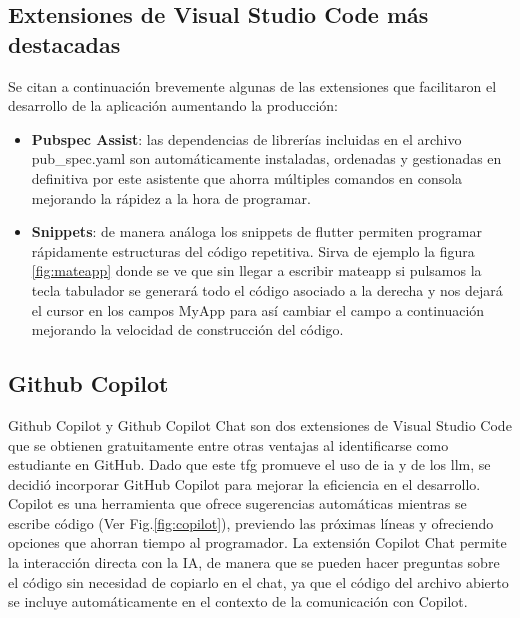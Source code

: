 	\subsection{Extensiones de Visual Studio Code más destacadas}
		Se citan a continuación brevemente algunas de las extensiones que facilitaron el desarrollo de la aplicación aumentando la producción:
		\begin{itemize}
		
		\item \textbf{Pubspec Assist}: las dependencias de librerías incluidas en el archivo pub\_spec.yaml son automáticamente instaladas, ordenadas y gestionadas en definitiva por este asistente que ahorra múltiples comandos en consola mejorando la rápidez a la hora de programar.
		
		\item \textbf{Snippets}: de manera análoga los snippets de flutter permiten programar rápidamente estructuras del código repetitiva. 
		Sirva de ejemplo la figura \ref{fig:mateapp} donde se ve que sin llegar a escribir mateapp si pulsamos la tecla tabulador se generará todo el código asociado a la derecha y nos dejará el cursor en los campos MyApp para así cambiar el campo a continuación mejorando la velocidad de construcción del código.		
		\end{itemize}

	\subsection{Github Copilot}
	Github Copilot y Github Copilot Chat\cite{vscode_copilot} son dos extensiones de Visual Studio Code que se obtienen gratuitamente entre otras ventajas al identificarse como estudiante en GitHub. Dado que este \acrshort{tfg} promueve el uso de \acrfull{ia} y de los \acrshort{llm}, se decidió incorporar GitHub Copilot para mejorar la eficiencia en el desarrollo.
	Copilot es una herramienta que ofrece sugerencias automáticas mientras se escribe código (Ver Fig.\ref{fig:copilot}), previendo las próximas líneas y ofreciendo opciones que ahorran tiempo al programador.
	La extensión Copilot Chat permite la interacción directa con la IA, de manera que se pueden hacer preguntas sobre el código sin necesidad de copiarlo en el chat, ya que el código del archivo abierto se incluye automáticamente en el contexto de la comunicación con Copilot.
	
	
